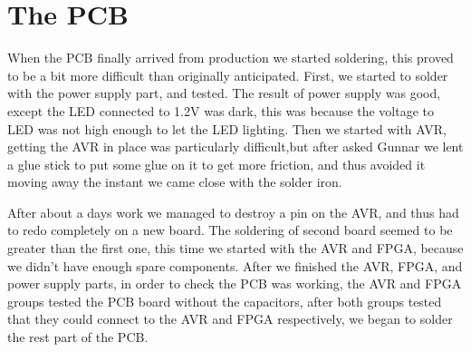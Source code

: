 \section {The PCB}

When the PCB finally arrived from production we started soldering, this proved to be a bit
more difficult than originally anticipated. First, we started to solder with the power supply part, and tested. The result of power supply was good, except the LED connected to 1.2V was dark, this was because the voltage to LED was not high enough to let the LED lighting. Then we started with AVR, getting the AVR in place was particularly difficult,but after asked Gunnar we lent a glue stick to put some glue on it to get more friction, and thus avoided it moving away the instant we came close with the solder iron.

After about a days work we managed to destroy a pin on the AVR, and thus had to redo completely on a new board. The soldering of second board seemed to be greater than the first one, this time we started with the AVR and FPGA, because we didn't have enough spare components. After we finished the AVR, FPGA, and power supply parts, in order to check the PCB was working, the AVR and FPGA groups tested the PCB board without the capacitors, after both groups tested that they could connect to the AVR and FPGA respectively, we began to solder the rest part of the PCB.  

